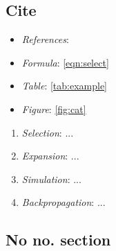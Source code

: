 \subsection{Cite}
\begin{itemize}
\item \emph{References}: \cite{silver2017mastering}
\item \emph{Formula}: \ref{eqn:select}
\item \emph{Table}: \ref{tab:example}
\item \emph{Figure}: \ref{fig:cat}
\end{itemize}

\begin{enumerate}
\item \emph{Selection}: ...
\item \emph{Expansion}: ...
\item \emph{Simulation}: ...
\item \emph{Backpropagation}: ...
\end{enumerate}

\subsection*{No no. section}
